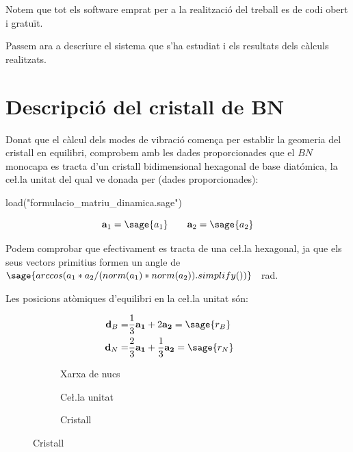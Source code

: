 \documentclass[12pt]{article} %
\let\vec\mathbf %
\begin{document}
Notem que tot els software emprat per a la realització del treball es de codi obert i gratuït.


Passem ara a descriure el sistema que s'ha estudiat i els resultats dels càlculs realitzats.

\newpage
\section{Descripció del cristall de BN}

Donat que el càlcul dels modes de vibració comen\c{c}a per establir la geomeria del cristall en equilibri, comprobem amb les dades proporcionades que el $BN$ monocapa es tracta d'un cristall bidimensional hexagonal de base diatómica, la ce\l.la unitat del qual ve donada per (dades proporcionades):

\begin{sagesilent}
load("formulacio_matriu_dinamica.sage")
\end{sagesilent}

\begin{equation}
\vec a_1=\sage{a_1}\qquad\vec a_2=\sage{a_2} 
\end{equation}

Podem comprobar que efectivament es tracta de una ce\l.la hexagonal, ja que els seus vectors primitius formen un angle de $\sage{arccos(a_1*a_2/(norm(a_1)*norm(a_2)).simplify())}$ \SI{}{\radian}.

Les posicions atòmiques d'equilibri en la ce\l.la unitat són:

\begin{equation}\begin{split}
\vec d_B=&\frac{1}{3}\vec{a_1}+2\vec{a_2}=\sage{r_B}\qquad\\
\vec d_N=&\frac{2}{3}\vec{a_1}+\frac{1}{3}\vec{a_2}=\sage{r_N} 
\end{split}\end{equation} 


\begin{figure}[h]
\centering
\begin{subfigure}[b]{0.3\textwidth}
\centering
{}
\caption{Xarxa de nucs}
\end{subfigure}
\begin{subfigure}[b]{0.3\textwidth}
\centering
{}
\caption{Ce\l.la unitat}
\end{subfigure}
\begin{subfigure}[b]{0.3\textwidth}
\centering
{}
\caption{Cristall}
\end{subfigure}
\end{figure}
\end{document}
